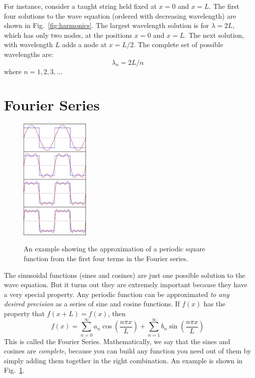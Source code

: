 \documentclass[12pt]{article}
\begin{document}
For instance, consider a taught string held fixed at $x=0$ and $x=L$.  The first four solutions to the wave equation (ordered with decreasing wavelength) are shown in Fig.~\ref{fig:harmonics}.  The largest wavelength solution is for $\lambda = 2 L$, which has only two nodes, at the positions $x=0$ and $x=L$.  The next solution, with wavelength $L$ adds a node at $x=L/2$.  The complete set of possible wavelengths are:
\begin{equation}
\lambda_n = 2 L / n
\end{equation}
where $n=1,2,3,...$

\section{Fourier Series}

\begin{figure}[thb]
\begin{center}
{\includegraphics[width=0.30\textwidth]{figs/fourier.png}}
\end{center}
\caption{\label{fig:fourier} An example showing the approximation of a periodic square function from the first four terms in the Fourier series.}
\end{figure}

The sinusoidal functions (sines and cosines) are just one possible solution to the wave equation.  But it turns out they are extremely important because they have a very special property.   Any periodic function can be approximated {\em to any desired precision} as a series of sine and cosine functions.   If $f(x)$ has the property that $f(x+L) = f(x)$, then
\begin{equation}
f(x) = \sum_{n=0}^\infty a_n \cos \left(\frac{n \pi x }{L} \right) + \sum_{n=1}^\infty b_n \sin \left(\frac{n \pi x}{L} \right)
\end{equation}
This is called the Fourier Series.  Mathematically, we say that the sines and cosines are {\em complete}, because you can build any function you need out of them by simply adding them together in the right combination.  An example is shown in Fig.~\ref{fig:fourier}.
\end{document}
